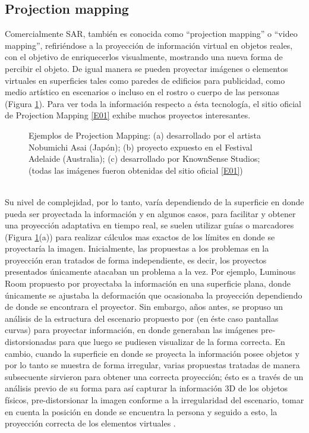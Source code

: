\documentclass[a4paper,openright,12pt]{report}
\begin{document}
\subsection{Projection mapping}
Comercialmente SAR, también es conocida como ``projection mapping'' o ``video mapping'', refiriéndose a la proyección de información virtual en objetos reales, con el objetivo de enriquecerlos visualmente, mostrando una nueva forma de percibir el objeto. De igual manera se pueden proyectar imágenes o elementos virtuales en superficies tales como paredes de edificios para publicidad, como medio artístico en escenarios o incluso en el rostro o cuerpo de las personas (Figura \ref{fig:projectionmapping}). Para ver toda la información respecto a ésta tecnología, el sitio oficial de Projection Mapping \hyperlink{e01}{[E01]} exhibe muchos proyectos interesantes.
\begin{figure}[h]
	\centering
	\caption[Ejemplos de Projection Mapping]{Ejemplos de Projection Mapping: (a) desarrollado por el artista Nobumichi Asai (Japón); (b) proyecto expuesto en el Festival Adelaide (Australia); (c) desarrollado por KnownSense Studios; (todas las imágenes fueron obtenidas del sitio oficial \hyperlink{e01}{[E01]})} \label{fig:projectionmapping}
\end{figure}\\
Su nivel de complejidad, por lo tanto, varía dependiendo de la superficie en donde pueda ser proyectada la información y en algunos casos, para facilitar y obtener una proyección adaptativa en tiempo real, se suelen utilizar guías o marcadores (Figura \ref{fig:projectionmapping}(a)) para realizar cálculos mas exactos de los límites en donde se proyectaría la imagen. Inicialmente, las propuestas a los problemas en la proyección eran tratados de forma independiente, es decir, los proyectos presentados únicamente atacaban un problema a la vez. Por ejemplo, Luminous Room propuesto por \cite{Under1997} proyectaba la información en una superficie plana, donde únicamente se ajustaba la deformación que ocasionaba la proyección dependiendo de donde se encontrara el proyector. Sin embargo, años antes, se propuso un análisis de la estructura del escenario propuesto por \cite{Dorsey1991} (en éste caso pantallas curvas) para proyectar información, en donde generaban las imágenes pre-distorsionadas para que luego se pudiesen visualizar de la forma correcta. En cambio, cuando la superficie en donde se proyecta la información posee objetos y por lo tanto se muestra de forma irregular, varias propuestas tratadas de manera subsecuente sirvieron para obtener una correcta proyección; ésto es a través de un análisis previo de su forma para así capturar la información 3D de los objetos físicos, pre-distorsionar la imagen conforme a la irregularidad del escenario, tomar en cuenta la posición en donde se encuentra la persona y seguido a esto, la proyección correcta de los elementos virtuales \citep{Raskar1998b,Raskar2001,Starner2003,Wilson2007}.\\
\end{document}
